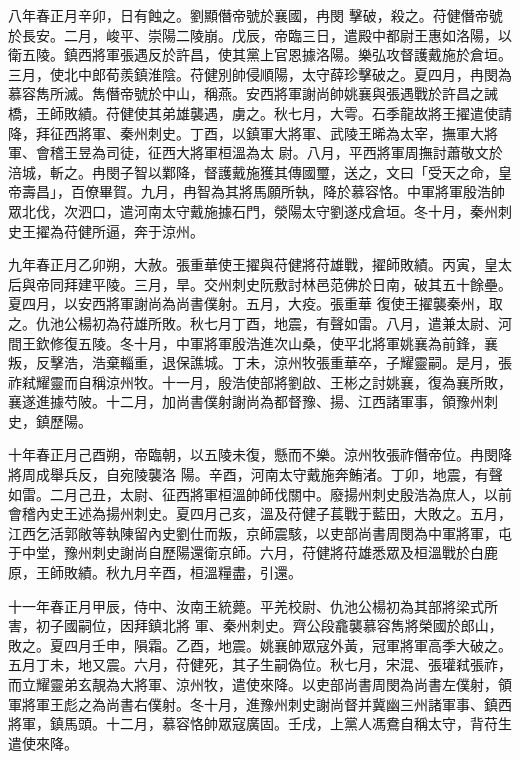 \begin{pinyinscope}
 八年春正月辛卯，日有蝕之。劉顯僭帝號於襄國，冉閔
 擊破，殺之。苻健僭帝號於長安。二月，峻平、崇陽二陵崩。戊辰，帝臨三日，遣殿中都尉王惠如洛陽，以衛五陵。鎮西將軍張遇反於許昌，使其黨上官恩據洛陽。樂弘攻督護戴施於倉垣。三月，使北中郎荀羨鎮淮陰。苻健別帥侵順陽，太守薛珍擊破之。夏四月，冉閔為慕容雋所滅。雋僭帝號於中山，稱燕。安西將軍謝尚帥姚襄與張遇戰於許昌之誡橋，王師敗績。苻健使其弟雄襲遇，虜之。秋七月，大雩。石季龍故將王擢遣使請降，拜征西將軍、秦州刺史。丁酉，以鎮軍大將軍、武陵王晞為太宰，撫軍大將軍、會稽王昱為司徒，征西大將軍桓溫為太
 尉。八月，平西將軍周撫討蕭敬文於涪城，斬之。冉閔子智以鄴降，督護戴施獲其傳國璽，送之，文曰「受天之命，皇帝壽昌」，百僚畢賀。九月，冉智為其將馬願所執，降於慕容恪。中軍將軍殷浩帥眾北伐，次泗口，遣河南太守戴施據石門，滎陽太守劉遂戍倉垣。冬十月，秦州刺史王擢為苻健所逼，奔于涼州。



 九年春正月乙卯朔，大赦。張重華使王擢與苻健將苻雄戰，擢師敗績。丙寅，皇太后與帝同拜建平陵。三月，旱。交州刺史阮敷討林邑范佛於日南，破其五十餘壘。夏四月，以安西將軍謝尚為尚書僕射。五月，大疫。張重華
 復使王擢襲秦州，取之。仇池公楊初為苻雄所敗。秋七月丁酉，地震，有聲如雷。八月，遣兼太尉、河間王欽修復五陵。冬十月，中軍將軍殷浩進次山桑，使平北將軍姚襄為前鋒，襄叛，反擊浩，浩棄輜重，退保譙城。丁未，涼州牧張重華卒，子耀靈嗣。是月，張祚弒耀靈而自稱涼州牧。十一月，殷浩使部將劉啟、王彬之討姚襄，復為襄所敗，襄遂進據芍陂。十二月，加尚書僕射謝尚為都督豫、揚、江西諸軍事，領豫州刺史，鎮歷陽。



 十年春正月己酉朔，帝臨朝，以五陵未復，懸而不樂。涼州牧張祚僭帝位。冉閔降將周成舉兵反，自宛陵襲洛
 陽。辛酉，河南太守戴施奔鮪渚。丁卯，地震，有聲如雷。二月己丑，太尉、征西將軍桓溫帥師伐關中。廢揚州刺史殷浩為庶人，以前會稽內史王述為揚州刺史。夏四月己亥，溫及苻健子萇戰于藍田，大敗之。五月，江西乞活郭敞等執陳留內史劉仕而叛，京師震駭，以吏部尚書周閔為中軍將軍，屯于中堂，豫州刺史謝尚自歷陽還衛京師。六月，苻健將苻雄悉眾及桓溫戰於白鹿原，王師敗績。秋九月辛酉，桓溫糧盡，引還。



 十一年春正月甲辰，侍中、汝南王統薨。平羌校尉、仇池公楊初為其部將梁式所害，初子國嗣位，因拜鎮北將
 軍、秦州刺史。齊公段龕襲慕容雋將榮國於郎山，敗之。夏四月壬申，隕霜。乙酉，地震。姚襄帥眾寇外黃，冠軍將軍高季大破之。五月丁未，地又震。六月，苻健死，其子生嗣偽位。秋七月，宋混、張瓘弒張祚，而立耀靈弟玄靚為大將軍、涼州牧，遣使來降。以吏部尚書周閔為尚書左僕射，領軍將軍王彪之為尚書右僕射。冬十月，進豫州刺史謝尚督并冀幽三州諸軍事、鎮西將軍，鎮馬頭。十二月，慕容恪帥眾寇廣固。壬戌，上黨人馮鴦自稱太守，背苻生遣使來降。




\end{pinyinscope}
